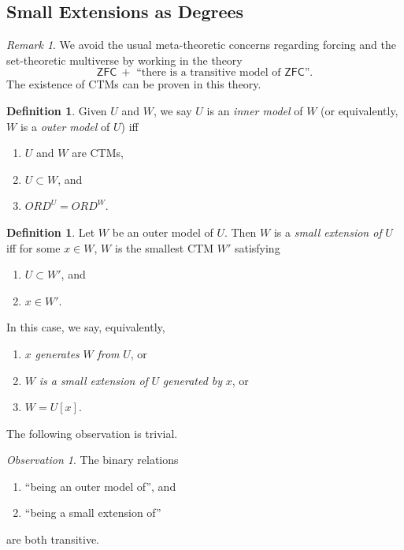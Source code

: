 \documentclass[12pt, twoside]{memoir}
\numberwithin{equation}{section}
\theoremstyle{definition}
\newtheorem{defi}[thm]{Definition}
\theoremstyle{remark}
\newtheorem{rem}[thm]{Remark}
\newtheorem{ob}[thm]{Observation}
\theoremstyle{definition}
\theoremstyle{definition}
\theoremstyle{definition}
\theoremstyle{remark}
\begin{document}
\subsection{Small Extensions as Degrees}

\begin{rem}
We avoid the usual meta-theoretic concerns regarding forcing and the set-theoretic multiverse by working in the theory 
\begin{equation*}
    \mathsf{ZFC} \ + \text{ ``there is a transitive model of } \mathsf{ZFC}\text{''.}
\end{equation*} 
The existence of CTMs can be proven in this theory.
\end{rem}

\begin{defi}
Given $U$ and $W$, we say $U$ is an \emph{inner model} of $W$ (or equivalently, $W$ is a \emph{outer model} of $U$) iff
\begin{enumerate}[label=(\alph*)]
    \item $U$ and $W$ are CTMs,
    \item $U \subset W$, and
    \item $ORD^U = ORD^W$.
\end{enumerate}
\end{defi}

\begin{defi}\label{def913}
Let $W$ be an outer model of $U$. Then $W$ is a \emph{small extension of} $U$ iff for some $x \in W$, $W$ is the smallest CTM $W'$ satisfying
\begin{enumerate}[label=(\alph*)]
    \item $U \subset W'$, and
    \item $x \in W'$.
\end{enumerate}
In this case, we say, equivalently,
\begin{enumerate}[label=(\arabic*)]
    \item $x$ \emph{generates} $W$ \emph{from} $U$, or
    \item $W$ \emph{is a small extension of} $U$ \emph{generated by} $x$, or
    \item $W = U[x]$.
\end{enumerate}
\end{defi}

The following observation is trivial.

\begin{ob}
The binary relations 
\begin{enumerate}[label=(\arabic*)]
    \item ``being an outer model of'', and
    \item ``being a small extension of''
\end{enumerate}
are both transitive.
\end{ob}
\end{document}
